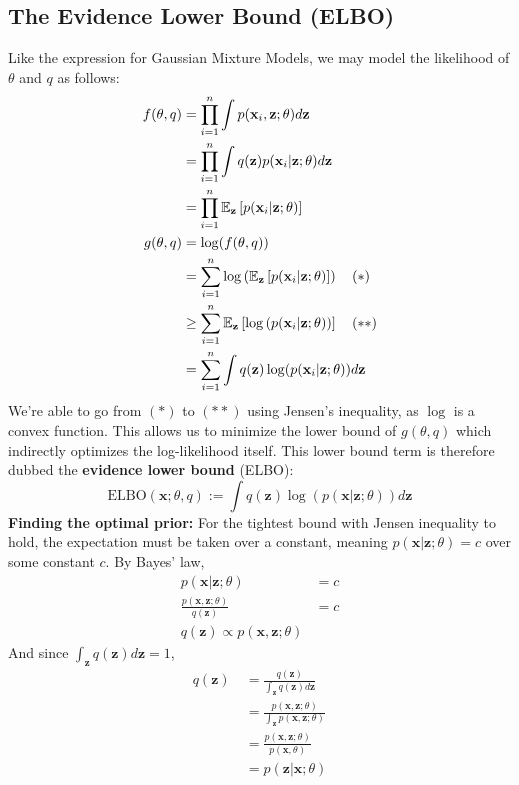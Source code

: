 \subsection{The Evidence Lower Bound (ELBO)}
Like the expression for Gaussian Mixture Models, we may model the likelihood of $\theta$ and $q$ as follows:
\begin{align*}
        f(\theta,q) 
        &= \prod_{i=1}^n \int p(\mathbf{x}_i,\mathbf{z};\theta)d\mathbf{z}\\
        &= \prod_{i=1}^n \int q(\mathbf{z}) p(\mathbf{x}_i|\mathbf{z};\theta)d\mathbf{z}\\
        &= \prod_{i=1}^n \mathbb{E}_\mathbf{z}\left[p(\mathbf{x}_i|\mathbf{z};\theta)\right]\\
        g(\theta,q) 
        &= \log(f(\theta,q)) \\
        &= \sum_{i=1}^n \log\left(\mathbb{E}_\mathbf{z}\left[p(\mathbf{x}_i|\mathbf{z};\theta)\right]\right) \quad (*) \\
        &\ge \sum_{i=1}^n \mathbb{E}_\mathbf{z}\left[\log\left(p(\mathbf{x}_i|\mathbf{z};\theta)\right)\right] \quad (**) \\
        &= \sum_{i=1}^n \int q(\mathbf{z}) \log(p(\mathbf{x}_i|\mathbf{z};\theta)) d\mathbf{z}
\end{align*}
We're able to go from $(*)$ to $(**)$ using Jensen's inequality, as $\log$ is a convex function. This allows us to minimize the lower bound of $g(\theta,q)$ which indirectly optimizes the log-likelihood itself. This lower bound term is therefore dubbed the \textbf{evidence lower bound} (ELBO):
\[
\text{ELBO}(\mathbf{x};\theta,q) := \int q(\mathbf{z}) \log(p(\mathbf{x}|\mathbf{z};\theta)) d\mathbf{z}
\]
\textbf{Finding the optimal prior:} For the tightest bound with Jensen inequality to hold, the expectation must be taken over a constant, meaning $p(\mathbf{x}|\mathbf{z};\theta)=c$ over some constant $c$. By Bayes' law,
\begin{align*}
    p(\mathbf{x}|\mathbf{z};\theta)&=c\\
    \frac{p(\mathbf{x},\mathbf{z};\theta)}{q(\mathbf{z})}&=c\\
    q(\mathbf{z}) \propto p(\mathbf{x},\mathbf{z};\theta)
\end{align*}
And since $\int_{\mathbf{z}} q(\mathbf{z}) d\mathbf{z}=1$,
\begin{align*}
    q(\mathbf{z}) \
    &= \frac{q(\mathbf{z})}{\int_{\mathbf{z}} q(\mathbf{z}) d\mathbf{z}} \\
    &= \frac{p(\mathbf{x},\mathbf{z};\theta)}{\int_{\mathbf{z}} p(\mathbf{x},\mathbf{z};\theta)} \\
    &= \frac{p(\mathbf{x},\mathbf{z};\theta)}{p(\mathbf{x},\theta)} \\
    &= p(\mathbf{z}|\mathbf{x};\theta)
\end{align*}
